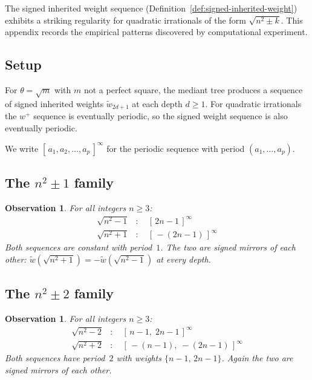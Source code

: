 \documentclass[12pt]{article}
\theoremstyle{definition}
\theoremstyle{remark}
\theoremstyle{plain}
\newtheorem{observation}[theorem]{Observation}
\begin{document}
The signed inherited weight sequence (Definition~\ref{def:signed-inherited-weight})
exhibits a striking regularity for quadratic irrationals of the form $\sqrt{n^2 \pm k}$.
This appendix records the empirical patterns discovered by computational experiment.

\subsection*{Setup}

For $\theta = \sqrt{m}$ with $m$ not a perfect square, the mediant tree produces a
sequence of signed inherited weights $\widetilde{w}_{2d+1}$ at each depth $d \geq 1$.
For quadratic irrationals the $w^+$ sequence is eventually periodic, so the signed
weight sequence is also eventually periodic.

We write $[\,a_1, a_2, \ldots, a_p\,]^\infty$ for the periodic sequence with period
$(a_1, \ldots, a_p)$.

\subsection*{The \texorpdfstring{$n^2 \pm 1$}{n^2 pm 1} family}

\begin{observation}
\label{obs:sqrt-n2-pm-1}
For all integers $n \geq 3$:
\begin{align*}
\sqrt{n^2 - 1} &: \quad [\,2n-1\,]^\infty \\
\sqrt{n^2 + 1} &: \quad [\,-(2n-1)\,]^\infty
\end{align*}
Both sequences are constant with period~$1$.
The two are signed mirrors of each other: $\widetilde{w}(\sqrt{n^2+1}) = -\widetilde{w}(\sqrt{n^2-1})$
at every depth.
\end{observation}

\subsection*{The \texorpdfstring{$n^2 \pm 2$}{n^2 pm 2} family}

\begin{observation}
\label{obs:sqrt-n2-pm-2}
For all integers $n \geq 3$:
\begin{align*}
\sqrt{n^2 - 2} &: \quad [\,n-1,\; 2n-1\,]^\infty \\
\sqrt{n^2 + 2} &: \quad [\,-(n-1),\; -(2n-1)\,]^\infty
\end{align*}
Both sequences have period~$2$ with weights $\{n-1,\, 2n-1\}$.
Again the two are signed mirrors of each other.
\end{observation}
\end{document}
